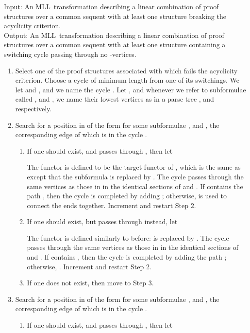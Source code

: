 \documentclass{LMCS}
\theoremstyle{plain}\newtheorem*{cLm}{Claim}
\newcommand{\mll}{MLL} \newcommand{\mall}{MALL}
\begin{document}
    \begin{algo} \label{MLLtoMDNFCycleAlg}
    Input: An \mll~transformation  describing a linear combination of proof structures over a common sequent with at least one structure breaking the acyclicity criterion. \\
    Output: An \mll~transformation  describing a linear combination of proof structures over a common sequent with at least one structure containing a switching cycle passing through no -vertices.
    \end{algo}
    \begin{enumerate}
    \item Select one of the proof structures associated with  which fails the acyclicity criterion. Choose a cycle of minimum length from one of its switchings. We let  and , and we name the cycle . Let , and whenever we refer to subformulae called ,  and , we name their lowest vertices as in a parse tree ,  and  respectively.
    
    \item Search for a position in  of the form  for some subformulae ,  and , the corresponding edge  of which is in the cycle .
    	\begin{enumerate}
    	\item If one should exist, and  passes through , then let
    	
    The functor  is defined to be the target functor of , which is the same as  except that the subformula  is replaced by . The cycle  passes through the same vertices as those in  in the identical sections of  and . If  contains the path , then the cycle  is completed by adding ; otherwise,  is used to connect the ends together. Increment  and restart Step 2.
    	\item If one should exist, but  passes through  instead, let
    	
    	 The functor  is defined similarly to before:  is replaced by . The cycle  passes through the same vertices as those in  in the identical sections of  and . If  contains , then the cycle  is completed by adding the path ; otherwise, . Increment  and restart Step 2.
    	\item If one does not exist, then move to Step 3.
    	\end{enumerate}
    	
    \item Search for a position in  of the form  for some subformulae ,  and , the corresponding edge  of which is in the cycle .
    	\begin{enumerate}
    	\item If one should exist, and  passes through , then let
    	

\end{enumerate}
\end{enumerate}
\end{document}

